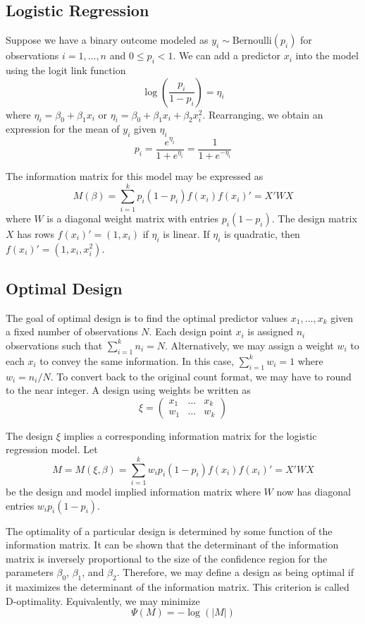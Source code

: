 \documentclass[11pt,a4paper]{article}
\begin{document}
\subsection{Logistic Regression}
Suppose we have a binary outcome modeled as $y_i \sim \text{Bernoulli}(p_i)$ for observations $i = 1, \dots, n$ and $0 \leq p_i < 1$. We can add a predictor $x_i$ into the model using the logit link function
$$
\log\left( \frac{p_i}{1-p_i}\right) = \eta_i
$$
where $\eta_i = \beta_0  + \beta_1 x_{i}$ or $\eta_i = \beta_0  + \beta_1 x_{i} + \beta_2 x_i^2$. Rearranging, we obtain an expression for the mean of $y_i$ given $\eta_i$
$$
p_i = \frac{e^{\eta_i}}{1+e^{\eta_i}}= \frac{1}{1+e^{-\eta_i}} 
$$

The information matrix for this model may be expressed as
$$
M(\beta) = \sum_{i=1}^k p_i (1-p_i) f(x_i) f(x_i)' = X'WX
$$
where $W$ is a diagonal weight matrix with entries $p_i (1-p_i)$. The design matrix $X$ has rows $f(x_i)' = (1, x_i)$ if $\eta_i$ is linear. If $\eta_i$ is quadratic, then $f(x_i)' = (1,x_i,x_i^2)$.
\subsection{Optimal Design}
The goal of optimal design is to find the optimal predictor values $x_1,\dots, x_k $ given a fixed number of observations $N$. Each design point $x_i$ is assigned $n_i$ observations such that $\sum_{i=1}^k n_i = N$. Alternatively, we may assign a weight $w_i$ to each $x_i$ to convey the same information. In this case, $\sum_{i=1}^k w_i = 1$ where $w_i = n_i/N$. To convert back to the original count format, we may have to round to the near integer. A design using weights be written as
$$
\xi =
\begin{pmatrix}
x_1 & \dots & x_k\\
w_1 & \dots & w_k
\end{pmatrix}
$$

The design $\xi$ implies a corresponding information matrix for the logistic regression model. Let
$$
M = M(\xi, \beta) = \sum_{i=1}^k w_ip_i (1-p_i) f(x_i) f(x_i)' = X'WX
$$
be the design and model implied information matrix where $W$ now has diagonal entries $w_i p_i (1-p_i)$.

The optimality of a particular design is determined by some function of the information matrix. It can be shown that the determinant of the information matrix is inversely proportional to the size of the confidence region for the parameters $\beta_0$, $\beta_1$, and $\beta_2$. Therefore, we may define a design as being optimal if it maximizes the determinant of the information matrix. This criterion is called D-optimality. Equivalently, we may minimize
$$
\Psi(M) = -\log(|M|)
$$
\end{document}

